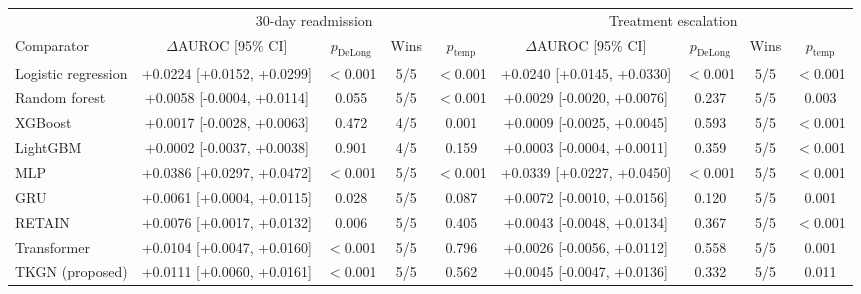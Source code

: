 \begin{tabular}{@{}l cccc cccc@{}}
\toprule
 & \multicolumn{4}{c}{30-day readmission} & \multicolumn{4}{c}{Treatment escalation} \\
\cmidrule(lr){2-5}\cmidrule(lr){6-9}
Comparator & $\Delta$AUROC [95\% CI] & $p_\text{DeLong}$ & Wins & $p_\text{temp}$ & $\Delta$AUROC [95\% CI] & $p_\text{DeLong}$ & Wins & $p_\text{temp}$ \\
\midrule
Logistic regression & +0.0224 [+0.0152, +0.0299] & $<$0.001 & 5/5 & $<$0.001 & +0.0240 [+0.0145, +0.0330] & $<$0.001 & 5/5 & $<$0.001 \\
Random forest & +0.0058 [-0.0004, +0.0114] & 0.055 & 5/5 & $<$0.001 & +0.0029 [-0.0020, +0.0076] & 0.237 & 5/5 & 0.003 \\
XGBoost & +0.0017 [-0.0028, +0.0063] & 0.472 & 4/5 & 0.001 & +0.0009 [-0.0025, +0.0045] & 0.593 & 5/5 & $<$0.001 \\
LightGBM & +0.0002 [-0.0037, +0.0038] & 0.901 & 4/5 & 0.159 & +0.0003 [-0.0004, +0.0011] & 0.359 & 5/5 & $<$0.001 \\
MLP & +0.0386 [+0.0297, +0.0472] & $<$0.001 & 5/5 & $<$0.001 & +0.0339 [+0.0227, +0.0450] & $<$0.001 & 5/5 & $<$0.001 \\
GRU & +0.0061 [+0.0004, +0.0115] & 0.028 & 5/5 & 0.087 & +0.0072 [-0.0010, +0.0156] & 0.120 & 5/5 & 0.001 \\
RETAIN & +0.0076 [+0.0017, +0.0132] & 0.006 & 5/5 & 0.405 & +0.0043 [-0.0048, +0.0134] & 0.367 & 5/5 & $<$0.001 \\
Transformer & +0.0104 [+0.0047, +0.0160] & $<$0.001 & 5/5 & 0.796 & +0.0026 [-0.0056, +0.0112] & 0.558 & 5/5 & 0.001 \\
TKGN (proposed) & +0.0111 [+0.0060, +0.0161] & $<$0.001 & 5/5 & 0.562 & +0.0045 [-0.0047, +0.0136] & 0.332 & 5/5 & 0.011 \\
\bottomrule
\end{tabular}
